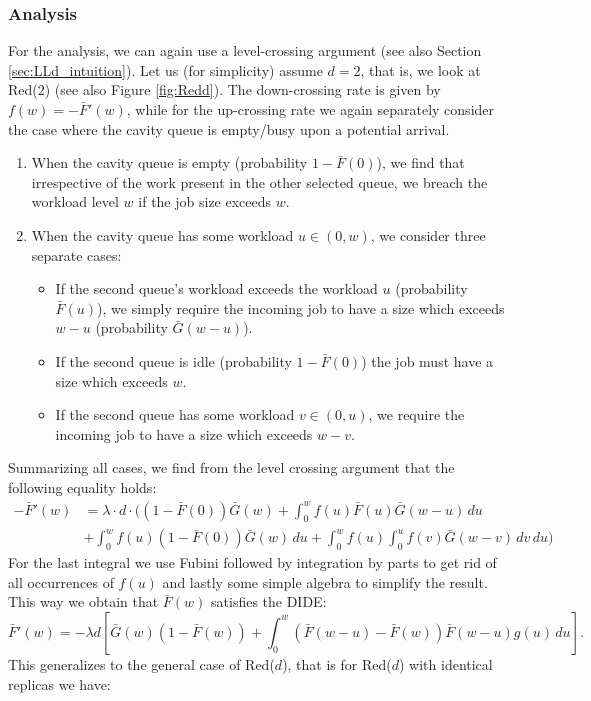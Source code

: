 \documentclass[12pt]{report}
\begin{document}
\subsubsection{Analysis}
For the analysis, we can again use a level-crossing argument (see also Section \ref{sec:LLd_intuition}). Let us (for simplicity) assume $d=2$, that is, we look at Red($2$) (see also Figure \ref{fig:Redd}). The down-crossing rate is given by $f(w) = - \bar F'(w)$, while for the up-crossing rate we again separately consider the case where the cavity queue is empty/busy upon a potential arrival.
\begin{enumerate}
\item When the cavity queue is empty (probability $1-\bar F(0)$), we find that irrespective of the work present in the other selected queue, we breach the workload level $w$ if the job size exceeds $w$.
\item When the cavity queue has some workload $u \in (0,w)$, we consider three separate cases: 
\begin{itemize}
\item If the second queue's workload exceeds the workload $u$ (probability $\bar F(u)$), we simply require the incoming job to have a size which exceeds $w-u$ (probability $\bar G(w-u)$).
\item If the second queue is idle (probability $1-\bar F(0)$) the job must have a size which exceeds $w$.
\item If the second queue has some workload $v \in (0,u)$, we require the incoming job to have a size which exceeds $w-v$.
\end{itemize}
\end{enumerate}
Summarizing all cases, we find from the level crossing argument that the following equality holds:
\begin{align*}
- \bar F'(w) &= \lambda \cdot d \cdot \bigg( (1- \bar F(0)) \bar G(w) + \int_0^w f(u) \bar F (u) \bar G(w-u) \, du \\
&+\int_0^w f(u) (1-\bar F(0)) \bar G(w) \, du + \int_0^w f(u) \int_0^u f(v) \bar G(w-v) \, dv \, du\bigg)
\end{align*}
For the last integral we use Fubini followed by integration by parts to get rid of all occurrences of $f(u)$ and lastly some simple algebra to simplify the result. This way we obtain that $\bar F(w)$ satisfies the DIDE:
$$
\bar F'(w) = -\lambda d \left[ \bar G(w) (1-\bar F(w)) + \int_0^w (\bar F(w-u) - \bar F(w)) \bar F(w-u) g(u) \, du \right].
$$
This generalizes to the general case of Red($d$), that is for Red($d$) with identical replicas we have:
\end{document}
